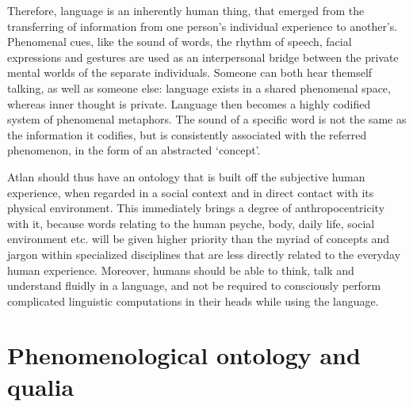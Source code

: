 Therefore, language is an inherently human thing, that emerged from the transferring of information from one person’s individual experience to another’s. Phenomenal cues, like the sound of words, the rhythm of speech, facial expressions and gestures are used as an interpersonal bridge between the private mental worlds of the separate individuals. Someone can both hear themself talking, as well as someone else: language exists in a shared phenomenal space, whereas inner thought is private. Language then becomes a highly codified system of phenomenal metaphors. The sound of a specific word is not the same as the information it codifies, but is consistently associated with the referred phenomenon, in the form of an abstracted ‘concept’. 

Atlan should thus have an ontology that is built off the subjective human experience, when regarded in a social context and in direct contact with its physical environment. This immediately brings a degree of anthropocentricity with it, because words relating to the human psyche, body, daily life, social environment etc. will be given higher priority than the myriad of concepts and jargon within specialized disciplines that are less directly related to the everyday human experience. Moreover, humans should be able to think, talk and understand fluidly in a language, and not be required to consciously perform complicated linguistic computations in their heads while using the language. 

 

\section{Phenomenological ontology and qualia} 

